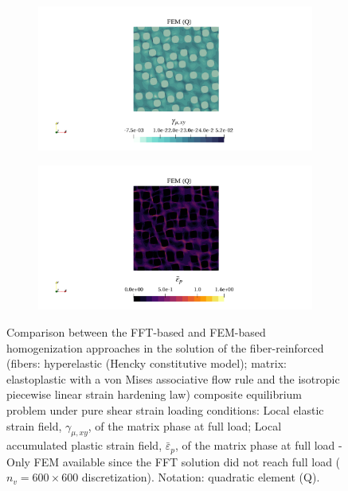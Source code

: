 \begin{figure}[hbt]
  \centering
	\begin{subfigure}[b]{\textwidth}
    \centering
    \includegraphics[width=\textwidth]{figures/von_mises_res_mat_large_strain_2D_shear_elastic_strain_12}
    \caption{}
    \label{subfig:von_mises_res_mat_large_strain_2D_shear_elastic_strain_12}
  \end{subfigure}
  \begin{subfigure}[b]{\textwidth}
    \centering
    \includegraphics[width=\textwidth]{figures/von_mises_res_mat_large_strain_2D_shear_palstic_strain}
    \caption{}
    \label{subfig:von_mises_res_mat_large_strain_2D_shear_palstic_strain}
  \end{subfigure}
  \caption{Comparison between the FFT-based and FEM-based homogenization approaches in the
  solution of the fiber-reinforced (fibers: hyperelastic (Hencky constitutive model); matrix: elastoplastic with a von Mises associative flow rule and the isotropic piecewise linear strain hardening law) composite equilibrium problem under pure shear strain loading conditions:  Local elastic strain field, \(\gamma_{\mu,xy}\), of the matrix phase at full load;  Local accumulated plastic strain field, \(\bar{\varepsilon}_{p}\), of the matrix phase at full load  - Only FEM available since the FFT solution did not reach full load (\(n_v = 600 \times 600\) discretization). Notation: quadratic element (Q).}
\label{fig:von_mises_res_mat_large_strain_2D_shear_local_fields}
\end{figure}
